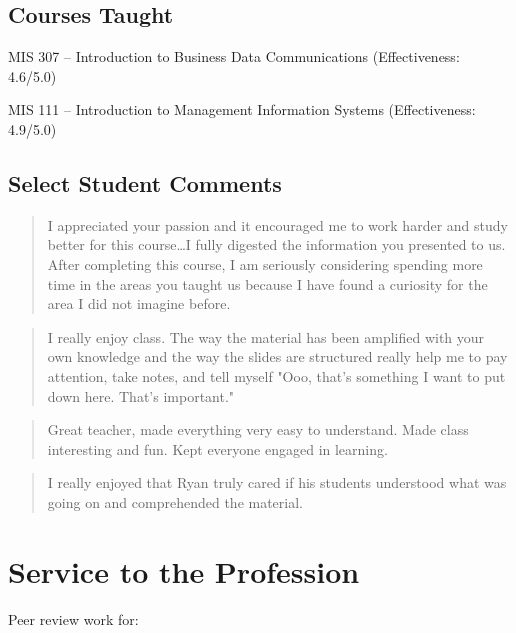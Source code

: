 \documentclass[10pt, letter]{article}
\newcommand{\years}[1]{\marginnote{\scriptsize #1}}
\begin{document}

\subsection*{Courses Taught}

\years{2013-2015}MIS 307 -- Introduction to Business Data Communications
(Effectiveness: 4.6/5.0)

\years{2012}MIS 111 -- Introduction to Management Information Systems
(Effectiveness: 4.9/5.0)

\subsection*{Select Student Comments}

\begin{quote}
  I appreciated your passion and it encouraged me to work harder and study better for this
  course\ldots I fully digested the information you presented to us. After completing this
  course, I am seriously considering spending more time in the areas you taught us because
  I have found a curiosity for the area I did not imagine before.
\end{quote}

\begin{quote}
  I really enjoy class. The way the material has been amplified with your own knowledge
  and the way the slides are structured really help me to pay attention, take notes, and
  tell myself "Ooo, that's something I want to put down here. That's important."
\end{quote}

\begin{quote}
  Great teacher, made everything very easy to understand. Made class interesting and
  fun. Kept everyone engaged in learning.
\end{quote}

\begin{quote}
  I really enjoyed that Ryan truly cared if his students understood what was going on and
  comprehended the material.
\end{quote}

\section*{Service to the Profession}
Peer review work for:
\end{document}
